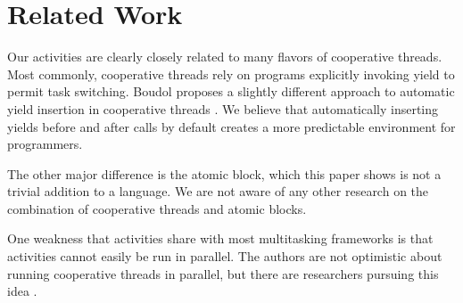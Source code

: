 \documentclass[acmsmall,anonymous,review]{acmart}\settopmatter{printfolios=true,printccs=false,printacmref=false}
\begin{document}



\section{Related Work}

Our activities are clearly closely related to many flavors of cooperative threads.
Most commonly, cooperative threads rely on programs explicitly invoking yield to permit task switching.
Boudol proposes a slightly different approach to automatic yield insertion in cooperative threads \cite{Boudol2007}.
We believe that automatically inserting yields before and after calls by default creates a more predictable environment for programmers.

The other major difference is the atomic block, which this paper shows is not a trivial addition to a language.
We are not aware of any other research on the combination of cooperative threads and atomic blocks.

One weakness that activities share with most multitasking frameworks is that activities cannot easily be run in parallel.
The authors are not optimistic about running cooperative threads in parallel, but there are researchers pursuing this idea \cite{ONeill2015, Boussinot2006, Dabrowski2006}.
\end{document}
